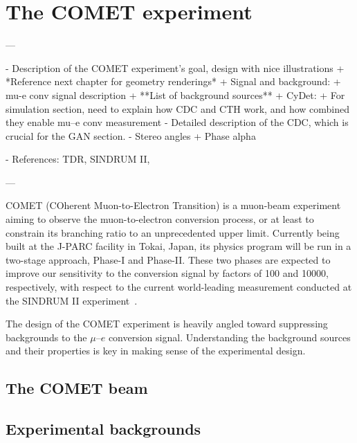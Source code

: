 \chapter{The COMET experiment}\label{chapter2}

\begin{markdown}
---

- Description of the COMET experiment's goal, design with nice illustrations
    + *Reference next chapter for geometry renderings*
    + Signal and background:
        + mu-e conv signal description
        + **List of background sources**
+ CyDet:
    + For simulation section, need to explain how CDC and CTH work, and how combined they enable mu--e conv measurement
    - Detailed description of the CDC, which is crucial for the GAN section.
     - Stereo angles
+ Phase alpha

- References: TDR, SINDRUM II, 

---
\end{markdown}

COMET (COherent Muon-to-Electron Transition) is a muon-beam experiment aiming to
observe the muon-to-electron conversion process, or at least to constrain its
branching ratio to an unprecedented upper limit. Currently being built at the
J-PARC facility in Tokai, Japan, its physics program will be run in a two-stage
approach, Phase-I and Phase-II. These two phases are expected to improve our
sensitivity to the conversion signal by factors of 100 and \num{10000},
respectively, with respect to the current world-leading measurement conducted at
the SINDRUM II experiment~\cite{Bertl:2006up}.




The design of the COMET experiment is heavily angled toward suppressing
backgrounds to the $\mu$--$e$ conversion signal. Understanding the background
sources and their properties is key in making sense of the experimental design.

\section{The COMET beam}\label{sec:COMET_beam}

\section{Experimental backgrounds}\label{sec:backgrounds}




